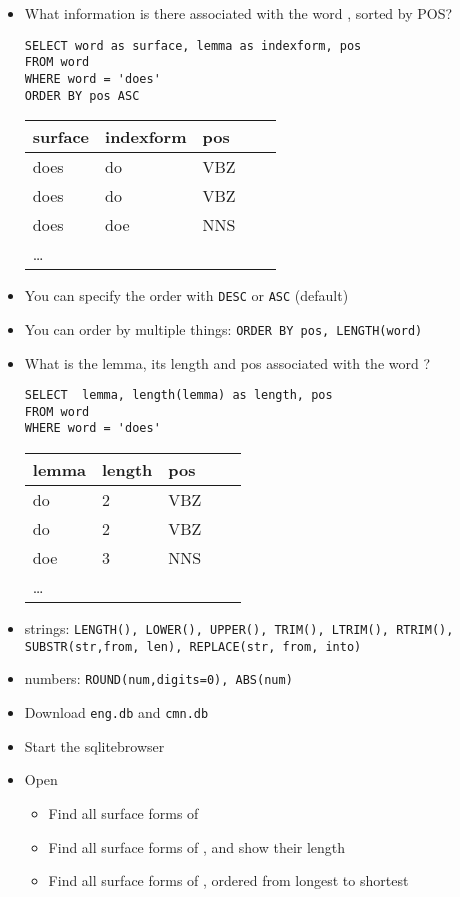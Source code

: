 \documentclass[a4paper,landscape,headrule,footrule,dvips]{foils}
\begin{document}
\begin{CJK}{UTF8}{min}

\begin{itemize}\addtolength{\itemsep}{-1ex}
\item What information is there associated with the word , sorted by POS?
\begin{verbatim}
SELECT word as surface, lemma as indexform, pos
FROM word
WHERE word = 'does'
ORDER BY pos ASC
\end{verbatim}
  \begin{tabular}{lllll}
    \textbf{surface}  & \textbf{indexform}  &  \textbf{pos} \\ \hline
    does & do  & VBZ \\
    does & do  & VBZ \\
    does & doe & NNS \\
    \ldots
  \end{tabular}
\item You can specify the order with \texttt{DESC} or \texttt{ASC} (default)
\item You can order by multiple things: \texttt{ORDER BY pos, LENGTH(word)}
\end{itemize}


\begin{itemize}\addtolength{\itemsep}{-1ex}
\item What is the lemma, its length and pos associated with the word ?
\begin{verbatim}
SELECT  lemma, length(lemma) as length, pos
FROM word
WHERE word = 'does'
\end{verbatim}
  \begin{tabular}{lllll}
    \textbf{lemma}  & \textbf{length}  &  \textbf{pos} \\ \hline
    do  & 2 &  VBZ \\
    do  & 2 &  VBZ \\
    doe & 3 &  NNS \\
    \ldots
  \end{tabular}
\item strings:  \texttt{LENGTH(), LOWER(), UPPER(), TRIM(), LTRIM(), RTRIM(), SUBSTR(str,from, len), REPLACE(str, from, into)}
\item numbers:  \texttt{ROUND(num,digits=0), ABS(num)}
\end{itemize}


\begin{itemize}
\item Download \texttt{eng.db} and \texttt{cmn.db}
\item Start the sqlitebrowser
\item Open 
  \begin{itemize}
  \item Find all surface forms of 
  \item Find all surface forms of , and show their length
  \item Find all surface forms of , ordered from longest to shortest
  \end{itemize}


\end{itemize}
\end{CJK}
\end{document}
